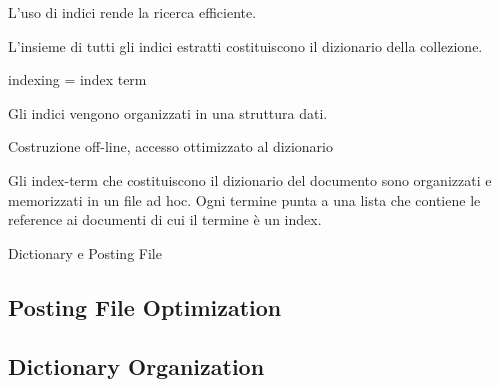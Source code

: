 L'uso di indici rende la ricerca efficiente.

L'insieme di tutti gli indici estratti costituiscono il dizionario della collezione.

indexing = index term

Gli indici vengono organizzati in una struttura dati.

Costruzione off-line, accesso ottimizzato al dizionario

Gli index-term che costituiscono il dizionario del documento sono organizzati e memorizzati in un file ad hoc.
Ogni termine punta a una lista che contiene le reference ai documenti di cui il termine è un index.

Dictionary e Posting File

\subsection{Posting File Optimization}

\subsection{Dictionary Organization}
